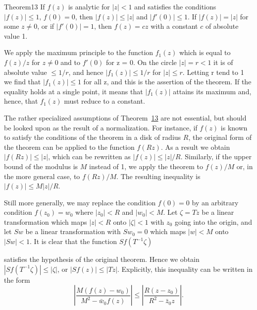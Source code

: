 \begin{originalstatement}{Theorem}{13}\label{thm:4.13}
If $f(z)$ is analytic for $|z| < 1$ and satisfies the conditions $|f(z)| \leq 1$, $f(0) = 0$, then $|f(z)| \leq |z|$ and $|f'(0)| \leq 1$. If $|f(z)| = |z|$ for some $z \neq 0$, or if $|f'(0)| = 1$, then $f(z) = cz$ with a constant $c$ of absolute value 1.
\end{originalstatement}
We apply the maximum principle to the function $f_{1}(z)$ which is equal to $f(z)/z$ for $z \neq 0$ and to $f'(0)$ for z = 0. On the circle $|z| = r < 1$ it is of absolute value $\leq 1/r$, and hence $|f_{1}(z)| \leq 1/r$ for $|z| \leq r$. Letting r tend to 1 we find that $|f_{1}(z)| \leq 1$ for all z, and this is the assertion of the theorem. If the equality holds at a single point, it means that $|f_{1}(z)|$ attains its maximum and, hence, that $f_{1}(z)$ must reduce to a constant.

The rather specialized assumptions of Theorem~\hyperref[thm:4.13]{13} are not essential, but should be looked upon as the result of a normalization. For instance, if $f(z)$ is known to satisfy the conditions of the theorem in a disk of radius $R$, the original form of the theorem can be applied to the function $f(Rz)$. As a result we obtain $|f(Rz)| \leq |z|$, which can be rewritten as $|f(z)| \leq |z| / R$. Similarly, if the upper bound of the modulus is $M$ instead of 1, we apply the theorem to $f(z) / M$ or, in the more general case, to $f(Rz) / M$. The resulting inequality is $|f(z)| \leq M |z| / R$.

Still more generally, we may replace the condition $f(0) = 0$ by an arbitrary condition $f(z_0) = w_0$ where $|z_0| < R$ and $|w_0| < M$. Let $\zeta = Tz$ be a linear transformation which maps $|z| < R$ onto $|\zeta| < 1$ with $z_0$ going into the origin, and let $Sw$ be a linear transformation with $Sw_0 = 0$ which maps $|w| < M$ onto $|Sw| < 1$. It is clear that the function $Sf(T^{-1}\zeta)$


satisfies the hypothesis of the original theorem. Hence we obtain $|Sf(T^{-1}\zeta)| \leq |\zeta|$, or $|Sf(z)| \leq |Tz|$. Explicitly, this inequality can be written in the form
\begin{equation*}
\left| \frac {M (f (z) - w _ {0})}{M ^ {2} - \bar {w} _ {0} f (z)} \right| \leq \left| \frac {R (z - z _ {0})}{R ^ {2} - \bar {z} _ {0} z} \right|.\tag{36}\label{eq:4.36}
\end{equation*}
